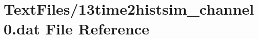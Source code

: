 \hypertarget{13time2histsim__channel0_8dat}{}\section{Text\+Files/13time2histsim\+\_\+channel0.dat File Reference}
\label{13time2histsim__channel0_8dat}
